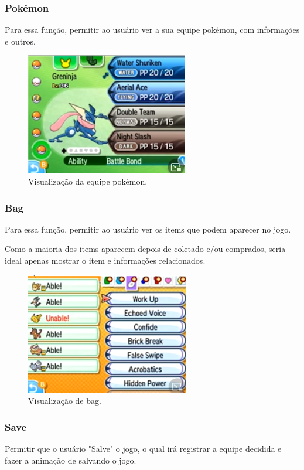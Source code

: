 \documentclass[../main.tex]{subfiles}
\begin{document}
\subsubsection{Pokémon}
Para essa função, permitir ao usuário ver a sua equipe pokémon, com informações e outros. \newline

\begin{figure}[H]
\centering
\includegraphics[scale=1]{../Images/softwareTeam.png}
\caption{Visualização da equipe pokémon.}
\end{figure}

\subsubsection{Bag}
Para essa função, permitir ao usuário ver os items que podem aparecer no jogo. \newline

Como a maioria dos items aparecem depois de coletado e/ou comprados, seria ideal apenas mostrar o item e informações relacionados. \newline

\begin{figure}[H]
\centering
\includegraphics[scale=1]{../Images/softwareBag.png}
\caption{Visualização de bag.}
\end{figure}

\subsubsection{Save}
Permitir que o usuário "Salve" o jogo, o qual irá registrar a equipe decidida e fazer a animação de salvando o jogo. \newline
\end{document}
